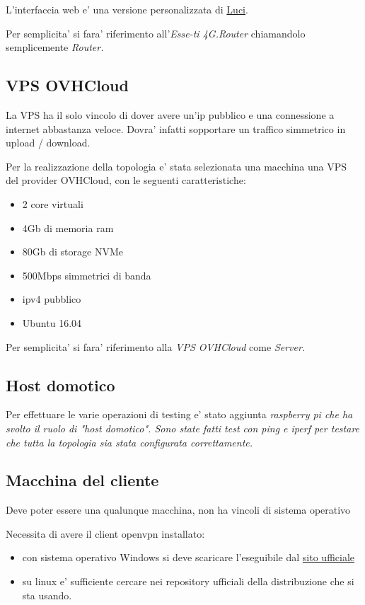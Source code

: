 \begin{figure}[H]
\end{figure}

L'interfaccia web e' una versione personalizzata di \href{https://openwrt.org/docs/guide-user/luci/start}{Luci}.

Per semplicita' si fara' riferimento all'\textit{Esse-ti 4G.Router} chiamandolo semplicemente \it{Router}.

\subsection{VPS OVHCloud}

La VPS ha il solo vincolo di dover avere un'ip pubblico e una connessione a internet abbastanza veloce. Dovra' infatti sopportare un traffico simmetrico in upload / download.

Per la realizzazione della topologia e' stata selezionata una macchina una VPS del provider OVHCloud, con le seguenti caratteristiche:

\begin{itemize}
	\item 2 core virtuali
	\item 4Gb di memoria ram
	\item 80Gb di storage NVMe
	\item 500Mbps simmetrici di banda
	\item ipv4 pubblico
	\item Ubuntu 16.04
\end{itemize}

Per semplicita' si fara' riferimento alla \textit{VPS OVHCloud} come \it{Server}.

\subsection{Host domotico}

Per effettuare le varie operazioni di testing e' stato aggiunta \it{raspberry pi} che ha svolto il ruolo di "host domotico". Sono state fatti test con ping e iperf per testare che tutta la topologia sia stata configurata correttamente.


\subsection{Macchina del cliente}

Deve poter essere una qualunque macchina, non ha vincoli di sistema operativo

Necessita di avere il client openvpn installato:

\begin{itemize}
	\item con sistema operativo Windows si deve scaricare l'eseguibile dal \href{https://openvpn.net/client-connect-vpn-for-windows/}{sito ufficiale}
	\item su linux e' sufficiente cercare nei repository ufficiali della distribuzione che si sta usando.
\end{itemize}


